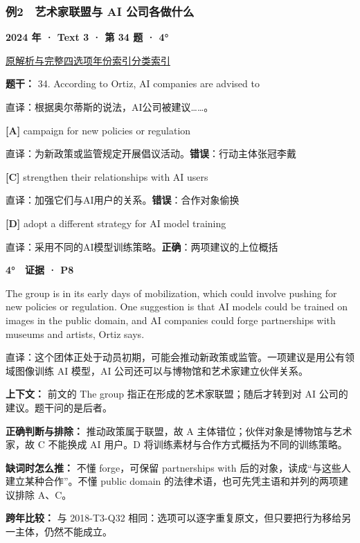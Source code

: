 \documentclass[11pt,a4paper]{article}
\begin{document}
\subsubsection{例2　艺术家联盟与 AI 公司各做什么}\label{case-2024-T3-Q34}
\noindent\textbf{2024 年 · Text 3 · 第 34 题 · 4°}\par\noindent \href{https://zj139.github.io/math-notes/english/45e4c8a550f2be01daf2d7ac/\#q34}{原解析与完整四选项}\quad \hyperref[idx-2024-T3-Q34]{年份索引}\quad \hyperref[class-R01]{分类索引}\par\smallskip
\noindent\textbf{题干：} 34. According to Ortiz, AI companies are advised to\par\smallskip
直译：根据奥尔蒂斯的说法，AI公司被建议……。

\noindent\textbf{[A]} campaign for new policies or regulation\par\nopagebreak
\noindent 直译：为新政策或监管规定开展倡议活动。\quad\textbf{错误}：行动主体张冠李戴\par\smallskip
{}\noindent\textbf{[C]} strengthen their relationships with AI users\par\nopagebreak
\noindent 直译：加强它们与AI用户的关系。\quad\textbf{错误}：合作对象偷换\par\smallskip
{}\noindent\textbf{[D]} adopt a different strategy for AI model training\par\nopagebreak
\noindent 直译：采用不同的AI模型训练策略。\quad\textbf{正确}：两项建议的上位概括\par\smallskip
\begin{evidence}\textbf{4°　证据 · P8}\par The group is in its early days of mobilization, which could involve pushing for new policies or regulation. One suggestion is that AI models could be trained on images in the public domain, and AI companies could forge partnerships with museums and artists, Ortiz says.\par 直译：这个团体正处于动员初期，可能会推动新政策或监管。一项建议是用公有领域图像训练 AI 模型，AI 公司还可以与博物馆和艺术家建立伙伴关系。\end{evidence}
\noindent\textbf{上下文：} 前文的 The group 指正在形成的艺术家联盟；随后才转到对 AI 公司的建议。题干问的是后者。\par\smallskip
\noindent\textbf{正确判断与排除：} 推动政策属于联盟，故 A 主体错位；伙伴对象是博物馆与艺术家，故 C 不能换成 AI 用户。D 将训练素材与合作方式概括为不同的训练策略。\par\smallskip
\noindent\textbf{缺词时怎么推：} 不懂 forge，可保留 partnerships with 后的对象，读成“与这些人建立某种合作”。不懂 public domain 的法律术语，也可先凭主语和并列的两项建议排除 A、C。\par\smallskip
\noindent\textbf{跨年比较：} 与 2018-T3-Q32 相同：选项可以逐字重复原文，但只要把行为移给另一主体，仍然不能成立。\par\smallskip
\clearpage
\end{document}

